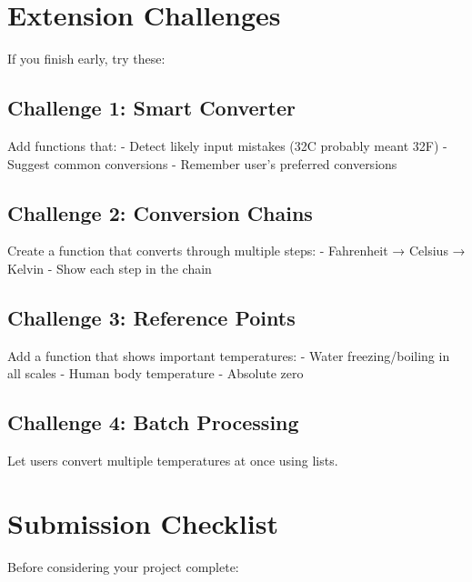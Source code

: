 \documentclass[
  letterpaper,
  DIV=11,
  numbers=noendperiod,
  oneside]{scrreprt}
\begin{document}
\section{Extension Challenges}\label{extension-challenges-4}

If you finish early, try these:

\subsection{Challenge 1: Smart
Converter}\label{challenge-1-smart-converter}

Add functions that: - Detect likely input mistakes (32C probably meant
32F) - Suggest common conversions - Remember user's preferred
conversions

\subsection{Challenge 2: Conversion
Chains}\label{challenge-2-conversion-chains}

Create a function that converts through multiple steps: - Fahrenheit →
Celsius → Kelvin - Show each step in the chain

\subsection{Challenge 3: Reference
Points}\label{challenge-3-reference-points}

Add a function that shows important temperatures: - Water
freezing/boiling in all scales - Human body temperature - Absolute zero

\subsection{Challenge 4: Batch
Processing}\label{challenge-4-batch-processing}

Let users convert multiple temperatures at once using lists.

\section{Submission Checklist}\label{submission-checklist-4}

Before considering your project complete:
\end{document}

